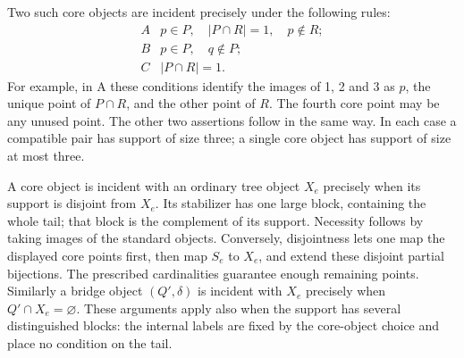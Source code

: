 Two such core objects are incident precisely under the following rules:
\begin{equation}\label{eq:coreflags}
\begin{array}{c|l}
 A&p\in P,\quad |P\cap R|=1,\quad p\notin R;\\
 B&p\in P,\quad q\notin P;\\
 C&|P\cap R|=1.
\end{array}                                                    \end{equation}
For example, in A these conditions identify the images of 1, 2 and 3
as $p$, the unique point of $P\cap R$, and the other point of $R$.
The fourth core point may be any unused point. The other two assertions
follow in the same way. In each case a compatible pair has support of
size three; a single core object has support of size at most three.

A core object is incident with an ordinary tree object $X_e$ precisely
when its support is disjoint from $X_e$. Its stabilizer has one large
block, containing the whole tail; that block is the complement of its
support. Necessity follows by taking images of the standard objects.
Conversely, disjointness lets one map the displayed core points first,
then map $S_e$ to $X_e$, and extend these disjoint partial bijections.
The prescribed cardinalities guarantee enough remaining points.
Similarly a bridge object $(Q',\delta)$ is incident with $X_e$ precisely
when $Q'\cap X_e=\varnothing$. These arguments apply also when the
support has several distinguished blocks: the internal labels are fixed
by the core-object choice and place no condition on the tail.

